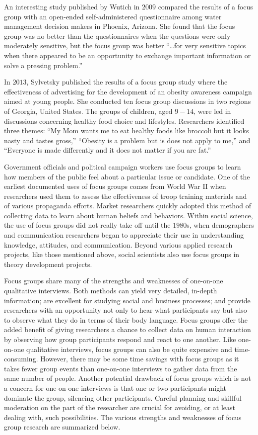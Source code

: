 An interesting study published by Wutich \etal in $ 2009 $ compared the results of a focus group with an open-ended self-administered questionnaire among water management decision makers in Phoenix, Arizona. \cite{wutich2010comparing} She found that the focus group was no better than the questionnaires when the questions were only moderately sensitive, but the focus group was better ``\ldots for very sensitive topics when there appeared to be an opportunity to exchange important information or solve a pressing problem.''

In $ 2013 $, Sylvetsky \etal published the results of a focus group study where the effectiveness of advertising for the development of an obesity awareness campaign aimed at young people. She conducted ten focus group discussions in two regions of Georgia, United States. The groups of children, aged $ 9 - 14 $, were led in discussions concerning healthy food choice and lifestyles. Researchers identified three themes: ``My Mom wants me to eat healthy foods like broccoli but it looks nasty and tastes gross,'' ``Obesity is a problem but is does not apply to me,'' and ``Everyone is made differently and it does not matter if you are fat.''

Government officials and political campaign workers use focus groups to learn how members of the public feel about a particular issue or candidate. One of the earliest documented uses of focus groups comes from World War II when researchers used them to assess the effectiveness of troop training materials and of various propaganda efforts. \cite{merton1946focused} Market researchers quickly adopted this method of collecting data to learn about human beliefs and behaviors. Within social science, the use of focus groups did not really take off until the $ 1980 $s, when demographers and communication researchers began to appreciate their use in understanding knowledge, attitudes, and communication. Beyond various applied research projects, like those mentioned above, social scientists also use focus groups in theory development projects. 

Focus groups share many of the strengths and weaknesses of one-on-one qualitative interviews. Both methods can yield very detailed, in-depth information; are excellent for studying social and business processes; and provide researchers with an opportunity not only to hear what participants say but also to observe what they do in terms of their body language. Focus groups offer the added benefit of giving researchers a chance to collect data on human interaction by observing how group participants respond and react to one another. Like one-on-one qualitative interviews, focus groups can also be quite expensive and time-consuming. However, there may be some time savings with focus groups as it takes fewer group events than one-on-one interviews to gather data from the same number of people. Another potential drawback of focus groups which is not a concern for one-on-one interviews is that one or two participants might dominate the group, silencing other participants. Careful planning and skillful moderation on the part of the researcher are crucial for avoiding, or at least dealing with, such possibilities. The various strengths and weaknesses of focus group research are summarized below.

